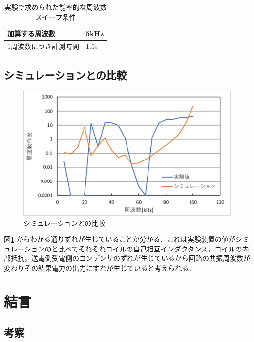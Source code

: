 \documentclass[12pt]{jarticle}
\begin{document}
\begin{table}[h]
	\caption{実験で求められた能率的な周波数スイープ条件}
	\centering
	\begin{tabular}{|l|l|}
		\hline
		加算する周波数     & 5kHz \\ \hline
		1周波数につき計測時間 & 1.5s \\ \hline
	\end{tabular}
\end{table}
\subsection{シミュレーションとの比較}
\begin{figure}[H]
	\centering
	\includegraphics[]{simuhikaku.png}
	\caption{シミュレーションとの比較}
	\label{fig:simuhikaku}
\end{figure}
図\ref{fig:simuhikaku} からわかる通りずれが生じていることが分かる．これは実験装置の値がシミュレーションのと比べてそれぞれコイルの自己相互インダクタンス，コイルの内部抵抗，送電側受電側のコンデンサのずれが生じているから回路の共振周波数が変わりその結果電力の出力にずれが生じていると考えられる．
\clearpage
\section{結言}
\subsection{考察}
\end{document}
